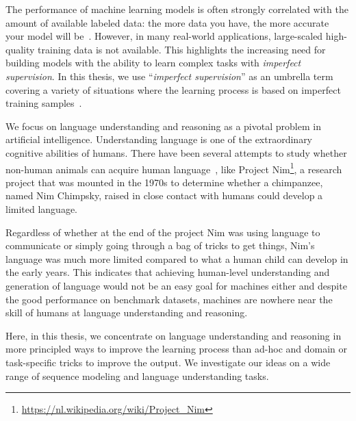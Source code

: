 
The performance of machine learning models is often strongly correlated with the amount of available labeled data:
the more data you have, the more accurate your model will be~\citep{halevy2009unreasonable,sun2017revisiting}.  
However, in many real-world applications, large-scaled high-quality training data is not available.
This highlights the increasing need for building models with the ability to learn complex tasks with \emph{imperfect supervision}. 
In this thesis, we use ``\emph{imperfect supervision}'' as an umbrella term covering a variety of situations where the learning process is based on imperfect training samples~\citep{zhou2018brief}.


We focus on language understanding and reasoning as a pivotal problem in artificial intelligence.  Understanding language is one of the extraordinary cognitive abilities of humans. 
There have been several attempts to study whether non-human animals can acquire human language~\citep{pepperberg2017animal}, like Project Nim\footnote{\url{https://nl.wikipedia.org/wiki/Project_Nim}}, a research project that was mounted in the 1970s to determine whether a chimpanzee, named Nim Chimpsky, raised in close contact with humans could develop a limited language. 

Regardless of whether at the end of the project Nim was using language to communicate or simply going through a bag of tricks to get things, Nim's language was much more limited compared to what a human child can develop in the early years. 
%
This indicates that achieving human-level understanding and generation of language would not be an easy goal for machines either and despite the good performance on benchmark datasets, machines are nowhere near the skill of humans at language understanding and reasoning.

Here, in this thesis, we concentrate on language understanding and reasoning in more principled ways to improve the learning process than ad-hoc and domain or task-specific tricks to improve the output. We investigate our ideas on a wide range of sequence modeling and language understanding tasks.


